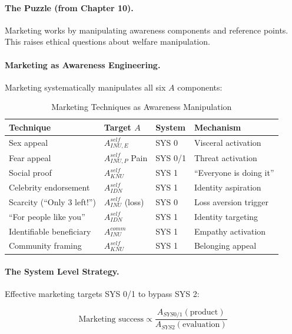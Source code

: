 \paragraph{The Puzzle (from Chapter 10).}
Marketing works by manipulating awareness components and reference points.
This raises ethical questions about welfare manipulation.

\paragraph{Marketing as Awareness Engineering.}
Marketing systematically manipulates all six $A$ components:

\begin{table}[htbp]
\centering
\caption{Marketing Techniques as Awareness Manipulation}
\label{tab:marketing-awareness}
\renewcommand{\arraystretch}{1.3}
\begin{tabular}{@{}llll@{}}
\toprule
\textbf{Technique} & \textbf{Target $A$} & \textbf{System} & \textbf{Mechanism} \\
\midrule
Sex appeal & $A^{self}_{INU,E}$ & SYS 0 & Visceral activation \\
Fear appeal & $A^{self}_{INU,P}$ Pain & SYS 0/1 & Threat activation \\
Social proof & $A^{self}_{KNU}$ & SYS 1 & ``Everyone is doing it'' \\
Celebrity endorsement & $A^{self}_{IDN}$ & SYS 1 & Identity aspiration \\
Scarcity (``Only 3 left!'') & $A^{self}_{INU}$ (loss) & SYS 0 & Loss aversion trigger \\
``For people like you'' & $A^{self}_{IDN}$ & SYS 1 & Identity targeting \\
Identifiable beneficiary & $A^{comm}_{INU}$ & SYS 1 & Empathy activation \\
Community framing & $A^{self}_{KNU}$ & SYS 1 & Belonging appeal \\
\bottomrule
\end{tabular}
\end{table}

\paragraph{The System Level Strategy.}
Effective marketing targets SYS 0/1 to bypass SYS 2:

\begin{equation}
\text{Marketing success} \propto \frac{A_{SYS0/1}(\text{product})}{A_{SYS2}(\text{evaluation})}
\end{equation}

